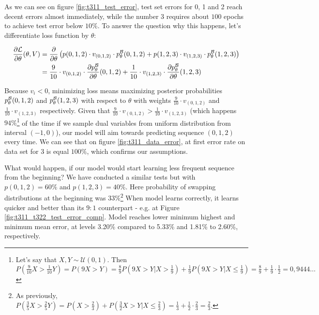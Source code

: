 \documentclass[shortabstract,lic,english]{iithesis}
\begin{document}
As we can see on figure \ref{fig:t311_test_error}, test set errors for 0, 1 and 2 reach decent errors almost immediately, while the number 3 requires about $100$ epochs to achieve test error below $10\%$. To answer the question why this happens, let's differentiate loss function by $\theta$:

\newcommand{\sumxsinB}{\sum_{(x1, x2, x3)\in \mathcal{B}}}
\begin{align}
    \frac{\partial\mathcal{L}}{\partial \theta}(\theta, V) &= \frac{\partial}{\partial \theta} \left(p(0, 1, 2) \cdot v_{(0, 1, 2)} \cdot p_\theta^\mathcal{B}(0, 1, 2) + p(1, 2, 3)\cdot v_{(1, 2, 3)} \cdot p_\theta^\mathcal{B}(1, 2, 3)\right) \\
    &= \frac{9}{10} \cdot v_{(0, 1, 2)} \cdot \frac{\partial p_\theta^\mathcal{B}}{\partial \theta}(0, 1, 2) + \frac{1}{10}\cdot v_{(1, 2, 3)} \cdot \frac{\partial p_\theta^\mathcal{B}}{\partial \theta}(1, 2, 3)
\end{align}

Because $v_i < 0$, minimizing loss means maximizing posterior probabilities $p_\theta^\mathcal{B}(0,1,2)$ and $p_\theta^\mathcal{B}(1,2,3)$ with respect to $\theta$ with weights $\frac{9}{10} \cdot v_{(0, 1, 2)}$ and $\frac{1}{10}\cdot v_{(1, 2, 3)}$ respectively. Given that $\frac{9}{10} \cdot v_{(0, 1, 2)} > \frac{1}{10}\cdot v_{(1, 2, 3)}$ (which happens $94\%$\footnote{Let's say that $X, Y \sim \mathcal{U}(0,1)$. Then $P\left(\frac{9}{10}X > \frac{1}{10}Y\right) = P\left(9X > Y\right) = \frac{8}{9}P\left(9X > Y | X > \frac{1}{9}\right) + \frac{1}{9}P\left(9X > Y | X \le \frac{1}{9}\right) = \frac{8}{9} + \frac{1}{9}\cdot\frac{1}{2} = 0,9444\dots$}
of the time if we sample dual variables from uniform distribution from interval $(-1, 0)$), our model will aim towards predicting sequence $(0,1,2)$ every time. We can see that on figure \ref{fig:t311_data_error}, at first error rate on data set for $3$ is equal $100\%$, which confirms our assumptions. 

What would happen, if our model would start learning less frequent sequence from the beginning? We have conducted a similar tests but with $p(0,1,2)=60\%$ and $p(1,2,3)=40\%$. Here probability of swapping distributions at the beginning was $33\%$\footnote{As previously, $P(\frac{3}{5}X>\frac{2}{5}Y) = P(X>\frac{2}{3}) + P(\frac{3}{2}X>Y|X\le\frac{2}{3})=\frac{1}{3} + \frac{1}{2}\cdot\frac{2}{3} = \frac{2}{3}$.} When model learns correctly, it learns quicker and better than its $9:1$ counterpart - e.g. at Figure \ref{fig:t311_t322_test_error_comp}. Model reaches lower minimum highest and minimum mean error, at levels 3.20\% compared to 5.33\% and 1.81\% to 2.60\%, respectively.
\end{document}

